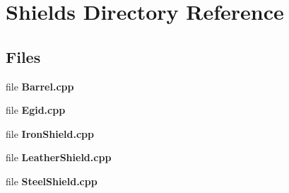 \section{Shields Directory Reference}
\label{dir_829ba1a36e8317026304b4b09ce1f189}
\subsection*{Files}
\begin{DoxyCompactItemize}
\item 
file {\bf Barrel.\-cpp}
\item 
file {\bf Egid.\-cpp}
\item 
file {\bf Iron\-Shield.\-cpp}
\item 
file {\bf Leather\-Shield.\-cpp}
\item 
file {\bf Steel\-Shield.\-cpp}
\end{DoxyCompactItemize}
